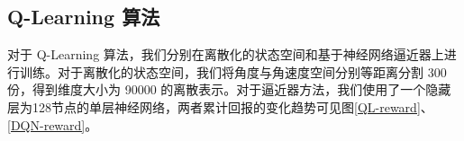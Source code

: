 \documentclass[conference,10pt]{IEEEtran}
\begin{document}
\subsection{Q-Learning 算法}
对于 Q-Learning 算法，我们分别在离散化的状态空间和基于神经网络逼近器上进行训练。对于离散化的状态空间，我们将角度与角速度空间分别等距离分割 300 份，得到维度大小为 90000 的离散表示。对于逼近器方法，我们使用了一个隐藏层为128节点的单层神经网络，两者累计回报的变化趋势可见图\ref{QL-reward}、\ref{DQN-reward}。
\begin{figure}[H]
	\centering
	\centering
	

\end{figure}
\end{document}
